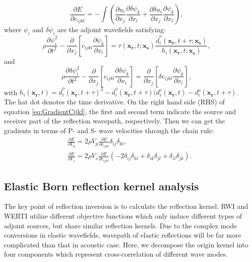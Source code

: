 \begin{equation}
	\frac{\partial E}{\partial c_{ijkl}}=-\int (\frac{\partial u_{i}}{\partial
	x_j}\frac{\partial \delta \psi_{k}}{\partial x_l}+\frac{\partial \delta u_{i}}{\partial
	x_j}\frac{\partial \psi_{k}}{\partial x_l}),
    \label{eq:GradientCijkl}
\end{equation}
where $\psi_i$ and $\delta \psi_i$ are the adjoint wavefields satisfying:
\begin{equation}
    \rho \frac{\partial \psi^2_i}{\partial t^2}  -
    \frac{\partial}{\partial x_j}\left[ 
        c_{ijkl}\frac{\partial \psi_{k}}{\partial
		x_l}\right]=\tau(\mathbf{x_r},t;\mathbf{x_s})\frac{\dot{d}^o_i(\mathbf{x_r},t+\tau;\mathbf{x_s})}{h_i(\mathbf{x_r},t;\mathbf{x_s})},
    \label{eq:AdjointWE} 
\end{equation}
and
\begin{equation}
    \rho \frac{\partial \delta \psi^2_i}{\partial t^2}  -
    \frac{\partial}{\partial x_j}\left[ 
        c_{ijkl}\frac{\partial \delta \psi_{k}}{\partial
        x_l}\right]=\frac{\partial}{\partial x_j}\left[\delta c_{ijkl}\frac{\partial
		\psi_{k}}{\partial x_l}\right],
    \label{eq:AdjointDeltaWE} 
\end{equation}
with
$h_i(\mathbf{x_r},t)=\dot{d}^o_i(\mathbf{x_r},t+\tau)^2-\ddot{d}^o_i(\mathbf{x_r},t+\tau)(d^c_i(\mathbf{x_r},t)-d^o_i(\mathbf{x_r},t+\tau)$. The
hat dot denotes the time derivative. On the right hand side (RHS) of equation
\eqref{eq:GradientCijkl}, the first and second term indicate the source and receiver
part of the reflection wavepath, respectively. Then we can get the gradients in terms of P- and
S- wave velocities through the chain rule:
\begin{equation}
	\begin{split}
	&\frac{\partial E}{\partial V_p}=2\rho V_p\frac{\partial E}{\partial
		c_{ijkl}}\delta_{ij}\delta_{kl}, \\
	&\frac{\partial E}{\partial V_s}=2\rho V_s\frac{\partial
	E}{\partial c_{ijkl}}(-2\delta_{ij}\delta_{kl}+\delta_{ik}\delta_{jl}+
	\delta_{il}\delta_{jk}).
	\end{split}
    \label{eq:GradientVel}
\end{equation}

\subsection{Elastic Born reflection kernel analysis}
The key point of reflection inversion is to calculate the reflection kernel. 
RWI and WERTI utilize different objective functions which only induce different types of adjoint
sources, but share similar reflection kernels.
Due to the complex mode conversions in elastic wavefields, wavepath of elastic reflections will 
be far more complicated than that in acoustic case.
Here, we decompose the origin kernel into four components which 
represent cross-correlation of different wave modes.

